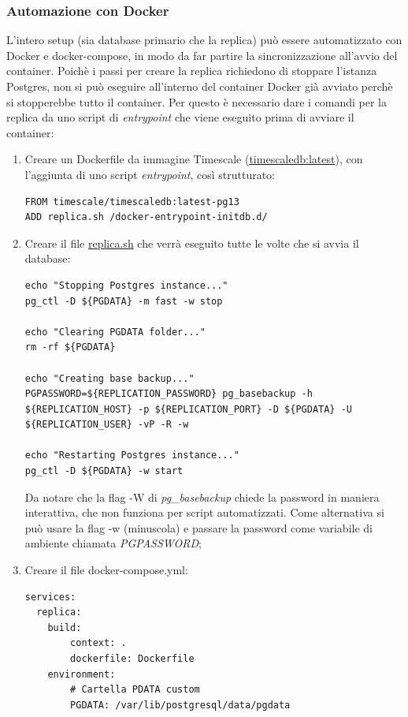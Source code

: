 \subsubsection{Automazione con Docker}
L'intero setup (sia database primario che la replica) può essere automatizzato con Docker e docker-compose, in modo da far partire la sincronizzazione all'avvio del container.
Poichè i passi per creare la replica richiedono di stoppare l'istanza Postgres, non si può eseguire all'interno del container Docker già avviato perchè si stopperebbe tutto il container.
Per questo è necessario dare i comandi per la replica da uno script di \textit{entrypoint} che viene eseguito prima di avviare il container:
\begin{enumerate}
  \item Creare un Dockerfile da immagine Timescale (\url{timescaledb:latest}), con l'aggiunta di uno script \textit{entrypoint}, così strutturato:
  \vspace{1mm}
  \begin{lstlisting}[]
FROM timescale/timescaledb:latest-pg13
ADD replica.sh /docker-entrypoint-initdb.d/
\end{lstlisting}
  \item Creare il file \url{replica.sh} che verrà eseguito tutte le volte che si avvia il database:
  \vspace{1mm}
  \begin{lstlisting}[]
echo "Stopping Postgres instance..." 
pg_ctl -D ${PGDATA} -m fast -w stop

echo "Clearing PGDATA folder..." 
rm -rf ${PGDATA}

echo "Creating base backup..." 
PGPASSWORD=${REPLICATION_PASSWORD} pg_basebackup -h ${REPLICATION_HOST} -p ${REPLICATION_PORT} -D ${PGDATA} -U ${REPLICATION_USER} -vP -R -w

echo "Restarting Postgres instance..." 
pg_ctl -D ${PGDATA} -w start
\end{lstlisting}
Da notare che la flag -W di \textit{pg\_basebackup} chiede la password in maniera interattiva, che non funziona per script automatizzati. Come alternativa si può usare la flag -w (minuscola) e passare la password come variabile di ambiente chiamata \textit{PGPASSWORD};
\item Creare il file docker-compose.yml:
\vspace{1mm}
  \begin{lstlisting}[]
services:
  replica:
    build:
        context: .
        dockerfile: Dockerfile
    environment:
        # Cartella PDATA custom
        PGDATA: /var/lib/postgresql/data/pgdata


\end{lstlisting}
\end{enumerate}
